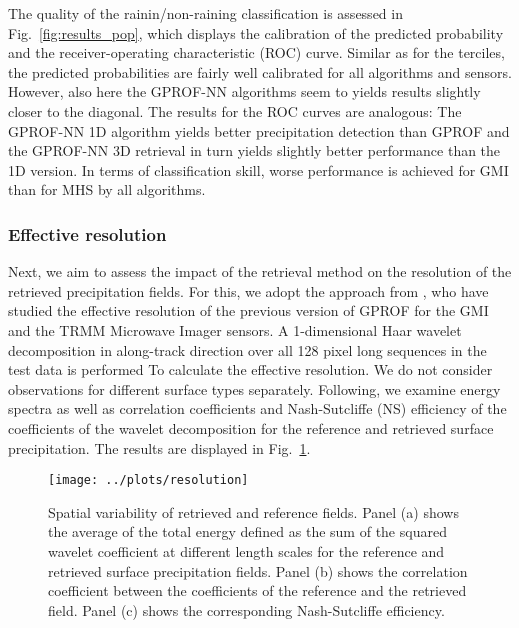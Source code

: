 \documentclass[a4paper,11pt,bibtotoc]{scrartcl}
\begin{document}
The quality of the rainin/non-raining classification is assessed in
Fig.~\ref{fig:results_pop}, which displays the calibration of the predicted
probability and the receiver-operating characteristic (ROC) curve. Similar as
for the terciles, the predicted probabilities are fairly well calibrated for all
algorithms and sensors. However, also here the GPROF-NN algorithms seem to
yields results slightly closer to the diagonal. The results for the ROC curves
are analogous: The GPROF-NN 1D algorithm yields better precipitation detection
than GPROF and the GPROF-NN 3D retrieval in turn yields slightly better
performance than the 1D version. In terms of classification skill, worse
performance is achieved for GMI than for MHS by all algorithms.


\subsubsection{Effective resolution}

Next, we aim to assess the impact of the retrieval method on the resolution of
the retrieved precipitation fields. For this, we adopt the approach from
\citet{guilloteau17}, who have studied the effective resolution of the previous
version of GPROF for the GMI and the TRMM Microwave Imager sensors. A
1-dimensional Haar wavelet decomposition in along-track direction over all 128
pixel long sequences in the test data is performed To calculate the effective
resolution. We do not consider observations for different surface types
separately. Following, \citet{guilloteau17} we examine energy spectra as well as
correlation coefficients and Nash-Sutcliffe (NS) efficiency of the coefficients
of the wavelet decomposition for the reference and retrieved surface
precipitation. The results are displayed in Fig.~\ref{fig:resolution}.

\begin{figure}[hbpt!]
  \centering \texttt{[image: ../plots/resolution]}
  \caption{ Spatial variability of retrieved and reference fields. Panel (a)
    shows the average of the total energy defined as the sum of the squared
    wavelet coefficient at different length scales for the reference and
    retrieved surface precipitation fields. Panel (b) shows the correlation
    coefficient between the coefficients of the reference and the retrieved
    field. Panel (c) shows the corresponding Nash-Sutcliffe efficiency. }
  \label{fig:resolution}
\end{figure}
\end{document}
